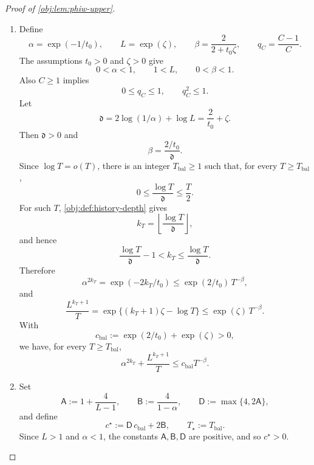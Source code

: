 \begin{proof}[Proof of \cref{obj:lem:phiw-upper}]
\begin{enumerate}
\item Define
\[
\alpha=\exp(-1/t_0),\qquad L=\exp(\zeta),\qquad
\beta=\frac{2}{2+t_0\zeta},
\qquad q_C=\frac{C-1}{C}.
\]
The assumptions \(t_0>0\) and \(\zeta>0\) give
\[
0<\alpha<1,\qquad 1<L,\qquad 0<\beta<1.
\]
Also \(C\ge1\) implies
\[
0\le q_C\le1,\qquad q_C^2\le1.
\]
Let
\[
\mathfrak d
=
2\log(1/\alpha)+\log L
=
\frac{2}{t_0}+\zeta .
\]
Then \(\mathfrak d>0\) and
\[
\beta=\frac{2/t_0}{\mathfrak d}.
\]
Since \(\log T=o(T)\), there is an integer \(T_{\mathrm{bal}}\ge1\) such that, for every
\(T\ge T_{\mathrm{bal}}\),
\[
0\le \frac{\log T}{\mathfrak d}\le \frac{T}{2}.
\]
For such \(T\), \cref{obj:def:history-depth} gives
\[
k_T=\left\lfloor\frac{\log T}{\mathfrak d}\right\rfloor ,
\]
and hence
\[
\frac{\log T}{\mathfrak d}-1<k_T\le \frac{\log T}{\mathfrak d}.
\]
Therefore
\[
\alpha^{2k_T}
=
\exp(-2k_T/t_0)
\le
\exp(2/t_0)\,T^{-\beta},
\]
and
\[
\frac{L^{k_T+1}}{T}
=
\exp\{(k_T+1)\zeta-\log T\}
\le
\exp(\zeta)\,T^{-\beta}.
\]
With
\[
c_{\mathrm{bal}}:=\exp(2/t_0)+\exp(\zeta)>0,
\]
we have, for every \(T\ge T_{\mathrm{bal}}\),
\[
\alpha^{2k_T}+\frac{L^{k_T+1}}{T}
\le
c_{\mathrm{bal}}T^{-\beta}.
\]

\item Set
\[
\mathsf A:=1+\frac{4}{L-1},
\qquad
\mathsf B:=\frac{4}{1-\alpha},
\qquad
\mathsf D:=\max\{4,2\mathsf A\},
\]
and define
\[
c^\star:=\mathsf D\,c_{\mathrm{bal}}+2\mathsf B,
\qquad
T_\star:=T_{\mathrm{bal}}.
\]
Since \(L>1\) and \(\alpha<1\), the constants \(\mathsf A,\mathsf B,\mathsf D\) are positive, and so
\(c^\star>0\).


\end{enumerate}
\end{proof}
